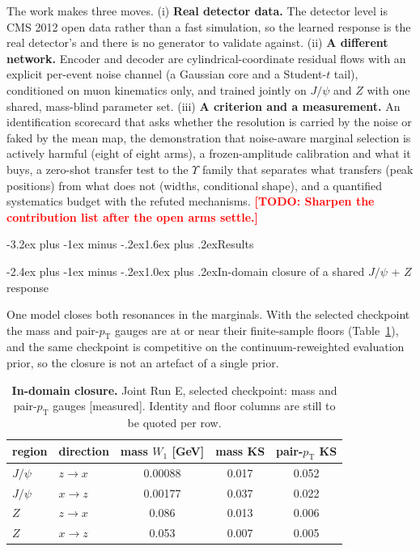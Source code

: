 \documentclass[11pt,a4paper]{article}
\makeatletter
\renewcommand\section{\@startsection{section}{1}{\z@}%
  {-3.2ex plus -1ex minus -.2ex}{1.6ex plus .2ex}{\normalfont\large\bfseries}}
\renewcommand\subsection{\@startsection{subsection}{2}{\z@}%
  {-2.4ex plus -1ex minus -.2ex}{1.0ex plus .2ex}{\normalfont\normalsize\bfseries}}
\newcommand{\pt}{\ensuremath{p_{\mathrm{T}}}}
\newcommand{\todo}[1]{\textcolor{red}{\textbf{[TODO: #1]}}}
\makeatother
\begin{document}
The work makes three moves. (i) \textbf{Real detector data.} The detector level is CMS
2012 open data rather than a fast simulation, so the learned response is the real
detector's and there is no generator to validate against. (ii) \textbf{A different network.}
Encoder and decoder are cylindrical-coordinate residual flows with an explicit
per-event noise channel (a Gaussian core and a Student-$t$ tail), conditioned on muon
kinematics only, and trained jointly on $J/\psi$ and $Z$ with one shared, mass-blind
parameter set. (iii) \textbf{A criterion and a measurement.} An identification scorecard
that asks whether the resolution is carried by the noise or faked by the mean map,
the demonstration that noise-aware marginal selection is actively harmful (eight of
eight arms), a frozen-amplitude calibration and what it buys, a zero-shot transfer
test to the $\Upsilon$ family that separates what transfers (peak positions) from what
does not (widths, conditional shape), and a quantified systematics budget with the
refuted mechanisms.
\todo{Sharpen the contribution list after the open arms settle.}

\section{Results}

\subsection{In-domain closure of a shared $J/\psi$ + $Z$ response}

One model closes both resonances in the marginals. With the selected checkpoint the
mass and pair-$\pt$ gauges are at or near their finite-sample floors
(Table~\ref{tab:runE}), and the same checkpoint is competitive on the
continuum-reweighted evaluation prior, so the closure is not an artefact of a single
prior.

\begin{table}[t]
\centering
\caption{\textbf{In-domain closure.} Joint Run E, selected checkpoint: mass and
pair-$\pt$ gauges \textnormal{[measured]}. Identity and floor columns are still to be
quoted per row.}
\label{tab:runE}
\begin{tabular}{llccc}
\toprule
region & direction & mass $W_1$ [GeV] & mass KS & pair-$\pt$ KS \\
\midrule
$J/\psi$ & $z\to x$ & 0.00088 & 0.017 & 0.052 \\
$J/\psi$ & $x\to z$ & 0.00177 & 0.037 & 0.022 \\
$Z$      & $z\to x$ & 0.086   & 0.013 & 0.006 \\
$Z$      & $x\to z$ & 0.053   & 0.007 & 0.005 \\
\bottomrule
\end{tabular}
\end{table}
\end{document}
